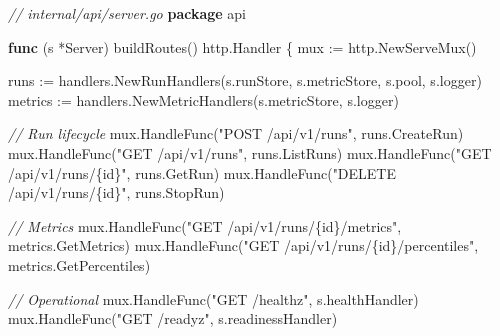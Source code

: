 \documentclass[
]{article}
\newenvironment{Shaded}{}{}
\newcommand{\CommentTok}[1]{\textcolor[rgb]{0.38,0.63,0.69}{\textit{#1}}}
\newcommand{\KeywordTok}[1]{\textcolor[rgb]{0.00,0.44,0.13}{\textbf{#1}}}
\newcommand{\NormalTok}[1]{#1}
\newcommand{\OperatorTok}[1]{\textcolor[rgb]{0.40,0.40,0.40}{#1}}
\newcommand{\StringTok}[1]{\textcolor[rgb]{0.25,0.44,0.63}{#1}}
\begin{document}
\begin{Shaded}
\begin{Highlighting}[]
\CommentTok{// internal/api/server.go}
\KeywordTok{package}\NormalTok{ api}

\KeywordTok{func} \OperatorTok{(}\NormalTok{s }\OperatorTok{*}\NormalTok{Server}\OperatorTok{)}\NormalTok{ buildRoutes}\OperatorTok{()}\NormalTok{ http}\OperatorTok{.}\NormalTok{Handler }\OperatorTok{\{}
\NormalTok{    mux }\OperatorTok{:=}\NormalTok{ http}\OperatorTok{.}\NormalTok{NewServeMux}\OperatorTok{()}

\NormalTok{    runs }\OperatorTok{:=}\NormalTok{ handlers}\OperatorTok{.}\NormalTok{NewRunHandlers}\OperatorTok{(}\NormalTok{s}\OperatorTok{.}\NormalTok{runStore}\OperatorTok{,}\NormalTok{ s}\OperatorTok{.}\NormalTok{metricStore}\OperatorTok{,}\NormalTok{ s}\OperatorTok{.}\NormalTok{pool}\OperatorTok{,}\NormalTok{ s}\OperatorTok{.}\NormalTok{logger}\OperatorTok{)}
\NormalTok{    metrics }\OperatorTok{:=}\NormalTok{ handlers}\OperatorTok{.}\NormalTok{NewMetricHandlers}\OperatorTok{(}\NormalTok{s}\OperatorTok{.}\NormalTok{metricStore}\OperatorTok{,}\NormalTok{ s}\OperatorTok{.}\NormalTok{logger}\OperatorTok{)}

    \CommentTok{// Run lifecycle}
\NormalTok{    mux}\OperatorTok{.}\NormalTok{HandleFunc}\OperatorTok{(}\StringTok{"POST /api/v1/runs"}\OperatorTok{,}\NormalTok{          runs}\OperatorTok{.}\NormalTok{CreateRun}\OperatorTok{)}
\NormalTok{    mux}\OperatorTok{.}\NormalTok{HandleFunc}\OperatorTok{(}\StringTok{"GET /api/v1/runs"}\OperatorTok{,}\NormalTok{           runs}\OperatorTok{.}\NormalTok{ListRuns}\OperatorTok{)}
\NormalTok{    mux}\OperatorTok{.}\NormalTok{HandleFunc}\OperatorTok{(}\StringTok{"GET /api/v1/runs/\{id\}"}\OperatorTok{,}\NormalTok{      runs}\OperatorTok{.}\NormalTok{GetRun}\OperatorTok{)}
\NormalTok{    mux}\OperatorTok{.}\NormalTok{HandleFunc}\OperatorTok{(}\StringTok{"DELETE /api/v1/runs/\{id\}"}\OperatorTok{,}\NormalTok{   runs}\OperatorTok{.}\NormalTok{StopRun}\OperatorTok{)}

    \CommentTok{// Metrics}
\NormalTok{    mux}\OperatorTok{.}\NormalTok{HandleFunc}\OperatorTok{(}\StringTok{"GET /api/v1/runs/\{id\}/metrics"}\OperatorTok{,}\NormalTok{       metrics}\OperatorTok{.}\NormalTok{GetMetrics}\OperatorTok{)}
\NormalTok{    mux}\OperatorTok{.}\NormalTok{HandleFunc}\OperatorTok{(}\StringTok{"GET /api/v1/runs/\{id\}/percentiles"}\OperatorTok{,}\NormalTok{   metrics}\OperatorTok{.}\NormalTok{GetPercentiles}\OperatorTok{)}

    \CommentTok{// Operational}
\NormalTok{    mux}\OperatorTok{.}\NormalTok{HandleFunc}\OperatorTok{(}\StringTok{"GET /healthz"}\OperatorTok{,}\NormalTok{     s}\OperatorTok{.}\NormalTok{healthHandler}\OperatorTok{)}
\NormalTok{    mux}\OperatorTok{.}\NormalTok{HandleFunc}\OperatorTok{(}\StringTok{"GET /readyz"}\OperatorTok{,}\NormalTok{      s}\OperatorTok{.}\NormalTok{readinessHandler}\OperatorTok{)}


\end{Highlighting}
\end{Shaded}
\end{document}
